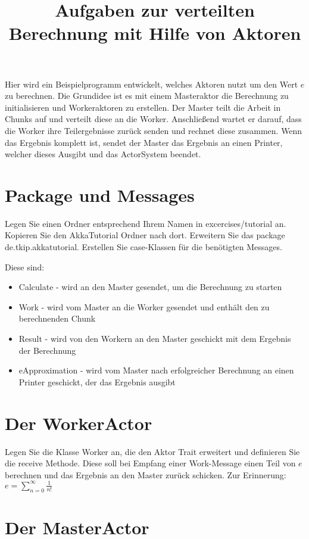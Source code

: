\documentclass[11pt]{tudexercise}
\title{Aufgaben zur verteilten Berechnung mit Hilfe von Aktoren}
\begin{document}
  \maketitle

  Hier wird ein Beispielprogramm entwickelt, welches Aktoren nutzt um den Wert $e$ zu berechnen.
Die Grundidee ist es mit einem Masteraktor die Berechnung zu initialisieren und Workeraktoren zu erstellen. Der Master teilt die Arbeit in Chunks auf und verteilt diese an die Worker. Anschließend wartet er darauf, dass die Worker ihre Teilergebnisse zurück senden und rechnet diese zusammen. Wenn das Ergebnis komplett ist, sendet der Master das Ergebnis an einen Printer, welcher dieses Ausgibt und das ActorSystem beendet.

\section{Package und Messages}

Legen Sie einen Ordner entsprechend Ihrem Namen in excercises/tutorial an. Kopieren Sie den AkkaTutorial Ordner nach dort. Erweitern Sie das package de.tkip.akkatutorial. Erstellen Sie case-Klassen für die benötigten Messages.

Diese sind:
\begin{itemize}
\item Calculate - wird an den Master gesendet, um die Berechnung zu starten
\item Work - wird vom Master an die Worker gesendet und enthält den zu berechnenden Chunk
\item Result - wird von den Workern an den Master geschickt mit dem Ergebnis der Berechnung
\item eApproximation - wird vom Master nach erfolgreicher Berechnung an einen Printer geschickt, der das Ergebnis ausgibt
\end{itemize}

\section{Der WorkerActor}

Legen Sie die Klasse Worker an, die den Aktor Trait erweitert und definieren Sie die receive Methode. Diese soll bei Empfang einer Work-Message einen Teil von $e$ berechnen und das Ergebnis an den Master zurück schicken. Zur Erinnerung: $e = \sum_{n=0}^{\infty}{\frac{1}{n!}}$

\section{Der MasterActor}
\end{document}
